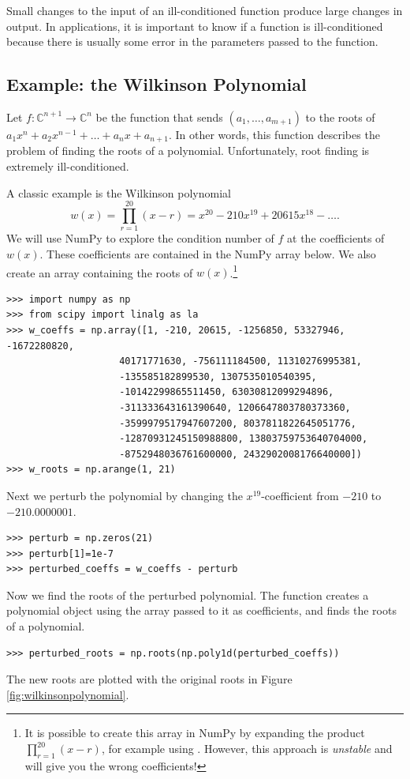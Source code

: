 Small changes to the input of an ill-conditioned function produce large changes in output.
In applications, it is important to know if a function is ill-conditioned because there is usually some error in the parameters passed to the function.

\subsection*{Example: the Wilkinson Polynomial}
Let $f:\mathbb{C}^{n+1} \rightarrow \mathbb{C}^n$ be the function that sends $(a_1, \ldots, a_{m+1})$ to the roots of $a_1x^n+a_2x^{n-1}+\ldots+a_nx+a_{n+1}$.
In other words, this function describes the problem of finding the roots of a polynomial.
Unfortunately, root finding is extremely ill-conditioned.

A classic example is the Wilkinson polynomial
\[
w(x) = \prod_{r=1}^{20}(x-r) = x^{20}-210x^{19}+20615x^{18}-\ldots.
\]
We will use NumPy to explore the condition number of $f$ at the coefficients of $w(x)$.
These coefficients are contained in the NumPy array  below.
We also create an array  containing the roots of $w(x)$.\footnote{
It is possible to create this array in NumPy by expanding the product $\prod_{r=1}^{20}(x-r)$, for example using .
However, this approach is \emph{unstable} and will give you the wrong coefficients!}
\begin{lstlisting}
>>> import numpy as np
>>> from scipy import linalg as la
>>> w_coeffs = np.array([1, -210, 20615, -1256850, 53327946, -1672280820,
                    40171771630, -756111184500, 11310276995381,
                    -135585182899530, 1307535010540395,
                    -10142299865511450, 63030812099294896,
                    -311333643161390640, 1206647803780373360,
                    -3599979517947607200, 8037811822645051776,
                    -12870931245150988800, 13803759753640704000,
                    -8752948036761600000, 2432902008176640000])
>>> w_roots = np.arange(1, 21)
\end{lstlisting}

Next we perturb the polynomial by changing the $x^{19}$-coefficient from $-210$ to $-210.0000001$.
\begin{lstlisting}
>>> perturb = np.zeros(21)
>>> perturb[1]=1e-7
>>> perturbed_coeffs = w_coeffs - perturb
\end{lstlisting}

Now we find the roots of the perturbed polynomial.
The function  creates a polynomial object using the array passed to it as coefficients, and  finds the roots of a polynomial.
\begin{lstlisting}
>>> perturbed_roots = np.roots(np.poly1d(perturbed_coeffs))
\end{lstlisting}
The new roots are plotted with the original roots in Figure \ref{fig:wilkinsonpolynomial}.

